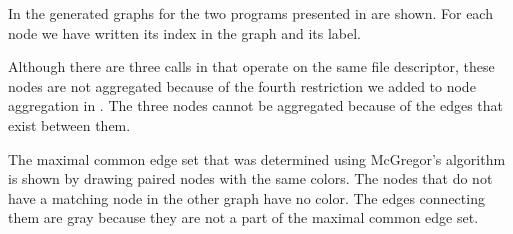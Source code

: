 \begin{center}
\begin{table}[htb]
  \caption{System calls for program_test and diff_test}
  \begin{center}
  \end{center}
  \label{table:test-programs}
\end{table}
\end{center}

In  the generated graphs for the two programs presented in  are shown. For each node we have written its index in the graph and its label.

Although there are three  calls in  that operate on the same file descriptor, these nodes are not aggregated because of the fourth restriction we added to node aggregation in . The three nodes cannot be aggregated because of the edges that exist between them.


The maximal common edge set that was determined using McGregor's algorithm is shown by drawing paired nodes with the same colors. The nodes that do not have a matching node in the other graph have no color. The edges connecting them are gray because they are not a part of the maximal common edge set.

